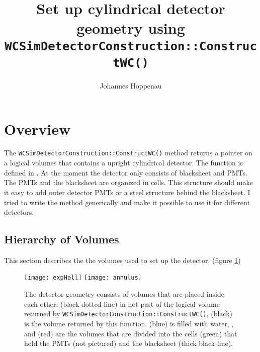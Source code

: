 
\author{Johannes Hoppenau}
\title{Set up cylindrical detector geometry using \LARGE\texttt{WCSimDetectorConstruction::ConstructWC()}}




\maketitle
\tableofcontents


\section{Overview}
The \texttt{WCSimDetectorConstruction::ConstructWC()} method returns a pointer on a logical volumes that contains a upright cylindrical detector. The function is defined in .
At the moment the detector only consists of blacksheet and PMTs. The PMTs and the blacksheet are organized in cells. This structure should make it easy to add outer detector PMTs or a steel structure behind the blacksheet. 
I tried to write the method generically and make it possible to use it for different detectors. 

\subsection{Hierarchy of Volumes}
This section describes the the volumes used to set up the detector. (figure \ref{fig:hi})
\begin{figure}
  \begin{center}
  \texttt{[image: expHall]} 
  \hspace{0.1\textwidth}
  \texttt{[image: annulus]}
  \end{center}
  \caption{The detector geometry consists of volumes that are placed inside each other:  (black dotted line) in not part of the logical volume returned by \texttt{WCSimDetectorConstruction::ConstructWC()},  (black) is the volume returned by this function,  (blue) is filled with water, ,  and   (red) are the volumes that are divided into the cells (green) that hold the PMTs (not pictured) and the blacksheet (thick black line).}\label{fig:hi}
\end{figure}


